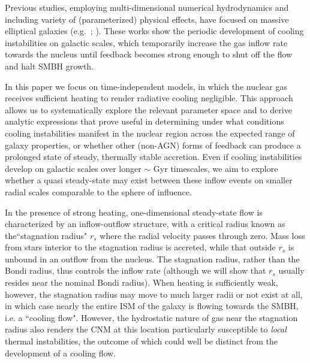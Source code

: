 \documentclass[usenatbib,fleqn]{mn2e}
\newcommand{\rs}{r_s}
\begin{document}
Previous studies, employing multi-dimensional numerical hydrodynamics and
including variety of (parameterized) physical effects, have focused on
massive elliptical galaxies (e.g.~\citealt{Ciotti&Ostriker07};
\citealt{Ciotti+10}).  These works show the periodic
development of cooling instabilities on galactic scales, which
temporarily increase the gas inflow rate towards the nucleus until
feedback becomes strong enough to shut off the flow and halt
SMBH growth.  

In this paper we focus on time-independent models, in which the
nuclear gas receives sufficient heating to render radiative cooling
negligible.  This approach allows us to systematically explore the
relevant parameter space and to derive analytic expressions that prove
useful in determining under what conditions cooling instabilities
manifest in the nuclear region across the expected range of galaxy
properties, or whether other (non-AGN) forms of feedback can produce a
prolonged state of steady, thermally stable accretion.  Even if
cooling instabilities develop on galactic scales over longer $\sim$
Gyr timescales, we aim to explore whether a quasi steady-state may
exist between these inflow events on smaller radial scales comparable
to the sphere of influence.


In the presence of strong heating, one-dimensional steady-state flow
is characterized by an inflow-outflow structure, with a critical
radius known as the``stagnation radius" $\rs$ where the radial
velocity passes through zero.  Mass loss from stars interior to the
stagnation radius is accreted, while that outside $\rs$ is unbound in
an outflow from the nucleus.  The stagnation radius, rather than the
Bondi radius, thus controls the inflow rate (although we will
show that $\rs$ usually resides near the nominal Bondi radius).  When
heating is sufficiently weak, however, the stagnation radius may move
to much larger radii or not exist at all, in which case nearly the
entire ISM of the galaxy is flowing towards the SMBH, i.e. a ``cooling
flow".  However, the hydrostatic nature of gas near the stagnation
radius also renders the CNM at this location particularly susceptible
to {\it local} thermal instabilities, the outcome of which could well
be distinct from the development of a cooling flow.
\end{document}

